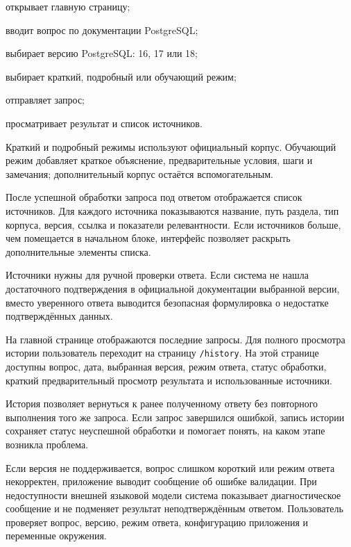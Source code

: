 \begin{compactlist}
  \item открывает главную страницу;
  \item вводит вопрос по документации PostgreSQL;
  \item выбирает версию PostgreSQL: 16, 17 или 18;
  \item выбирает краткий, подробный или обучающий режим;
  \item отправляет запрос;
  \item просматривает результат и список источников.
\end{compactlist}

Краткий и подробный режимы используют официальный корпус. Обучающий режим добавляет краткое объяснение, предварительные условия, шаги и замечания; дополнительный корпус остаётся вспомогательным.


После успешной обработки запроса под ответом отображается список источников. Для каждого источника показываются название, путь раздела, тип корпуса, версия, ссылка и показатели релевантности. Если источников больше, чем помещается в начальном блоке, интерфейс позволяет раскрыть дополнительные элементы списка.

Источники нужны для ручной проверки ответа. Если система не нашла достаточного подтверждения в официальной документации выбранной версии, вместо уверенного ответа выводится безопасная формулировка о недостатке подтверждённых данных.


На главной странице отображаются последние запросы. Для полного просмотра истории пользователь переходит на страницу \texttt{/history}. На этой странице доступны вопрос, дата, выбранная версия, режим ответа, статус обработки, краткий предварительный просмотр результата и использованные источники.

История позволяет вернуться к ранее полученному ответу без повторного выполнения того же запроса. Если запрос завершился ошибкой, запись истории сохраняет статус неуспешной обработки и помогает понять, на каком этапе возникла проблема.


Если версия не поддерживается, вопрос слишком короткий или режим ответа некорректен, приложение выводит сообщение об ошибке валидации. При недоступности внешней языковой модели система показывает диагностическое сообщение и не подменяет результат неподтверждённым ответом. Пользователь проверяет вопрос, версию, режим ответа, конфигурацию приложения и переменные окружения.
